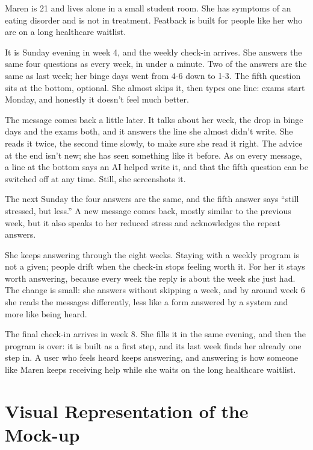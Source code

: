 \documentclass[a4paper]{article}
\begin{document}
Maren is 21 and lives alone in a small student room. She has symptoms of an eating disorder and is not in treatment. Featback is built for people like her who are on a long healthcare waitlist.

It is Sunday evening in week 4, and the weekly check-in arrives. She answers the same four questions as every week, in under a minute. Two of the answers are the same as last week; her binge days went from 4-6 down to 1-3. The fifth question sits at the bottom, optional. She almost skips it, then types one line: exams start Monday, and honestly it doesn't feel much better.

The message comes back a little later. It talks about her week, the drop in binge days and the exams both, and it answers the line she almost didn't write. She reads it twice, the second time slowly, to make sure she read it right. The advice at the end isn't new; she has seen something like it before. As on every message, a line at the bottom says an AI helped write it, and that the fifth question can be switched off at any time. Still, she screenshots it.

The next Sunday the four answers are the same, and the fifth answer says ``still stressed, but less.'' A new message comes back, mostly similar to the previous week, but it also speaks to her reduced stress and acknowledges the repeat answers.

She keeps answering through the eight weeks. Staying with a weekly program is not a given; people drift when the check-in stops feeling worth it. For her it stays worth answering, because every week the reply is about the week she just had. The change is small: she answers without skipping a week, and by around week 6 she reads the messages differently, less like a form answered by a system and more like being heard.

The final check-in arrives in week 8. She fills it in the same evening, and then the program is over: it is built as a first step, and its last week finds her already one step in. A user who feels heard keeps answering, and answering is how someone like Maren keeps receiving help while she waits on the long healthcare waitlist.

\newpage

\section{Visual Representation of the Mock-up}

\end{document}
